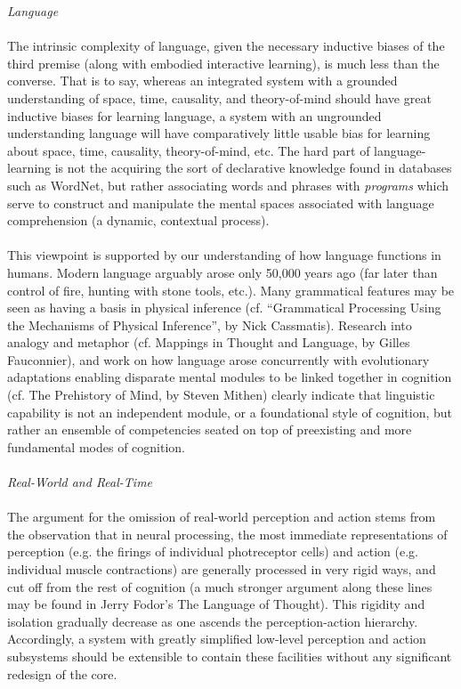 \documentclass[twoside,11pt]{article}
\begin{document}
\emph{Language}
\\ 
\\ 
 The intrinsic complexity of language, given the necessary inductive biases of the third premise (along with embodied interactive learning), is much less than the converse. That is to say, whereas an integrated system with a grounded understanding of space, time, causality, and theory-of-mind should have great inductive biases for learning language, a system with an ungrounded understanding language will have comparatively little usable bias for learning about space, time, causality, theory-of-mind, etc. The hard part of language-learning is not the acquiring the sort of declarative knowledge found in databases such as WordNet, but rather associating words and phrases with \emph{programs}
 which serve to construct and manipulate the mental spaces associated with language comprehension (a dynamic, contextual process).\\ 
\\ 
 This viewpoint is supported by our understanding of how language functions in humans. Modern language arguably arose only 50,000 years ago (far later than control of fire, hunting with stone tools, etc.). Many grammatical features may be seen as having a basis in physical inference (cf. ``Grammatical Processing Using the Mechanisms of Physical Inference'', by Nick Cassmatis). Research into analogy and metaphor (cf. Mappings in Thought and Language, by Gilles Fauconnier), and work on how language arose concurrently with evolutionary adaptations enabling disparate mental modules to be linked together in cognition (cf. The Prehistory of Mind, by Steven Mithen) clearly indicate that linguistic capability is not an independent module, or a foundational style of cognition, but rather an ensemble of competencies seated on top of preexisting and more fundamental modes of cognition.\\ 
\\ 
\emph{Real-World and Real-Time}
\\ 
\\ 
 The argument for the omission of real-world perception and action stems from the observation that in neural processing, the most immediate representations of perception (e.g. the firings of individual photreceptor cells) and action (e.g. individual muscle contractions) are generally processed in very rigid ways, and cut off from the rest of cognition (a much stronger argument along these lines may be found in Jerry Fodor's The Language of Thought). This rigidity and isolation gradually decrease as one ascends the perception-action hierarchy. Accordingly, a system with greatly simplified low-level perception and action subsystems should be extensible to contain these facilities without any significant redesign of the core.\\ 
\end{document}

